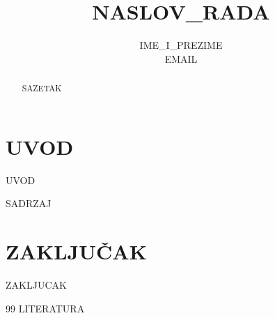 \documentclass[12pt,a4paper,twocolumn]{article}
\title{{{NASLOV_RADA}}}
\author{{{IME_I_PREZIME}} \\ \small {{EMAIL}}}
\date{}
\begin{document}
\maketitle

\begin{abstract}
{{SAZETAK}}
\end{abstract}

\section{UVOD}
{{UVOD}}

{{SADRZAJ}}

\section{ZAKLJUČAK}
{{ZAKLJUCAK}}

\begin{thebibliography}{99}
{{LITERATURA}}
\end{thebibliography}
\end{document}
